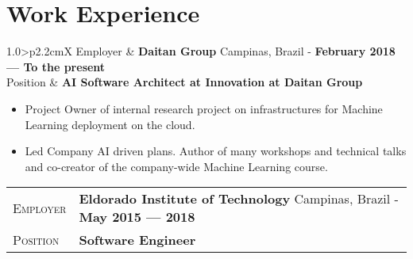 \documentclass[9pt, a4paper, oneside, final]{scrartcl} %
\newcommand{\gray}{\rowcolor[gray]{.90}} %
\begin{document}


\section{Work Experience}

\begin{center}
\begin{tabularx}{1.0\linewidth}{>{\raggedleft\scshape}p{2.2cm}X}
\gray Employer & \textbf{Daitan Group} \hfill Campinas, Brazil - \textbf{February 2018 --- To the present}\\
\gray Position & \textbf{AI Software Architect at Innovation at Daitan Group}\\
\end{tabularx}
\end{center}

\begin{itemize}\itemsep1.0pt \parskip1.5pt 
\item Project Owner of internal research project on infrastructures for Machine Learning deployment on the cloud.
\item Led Company AI driven plans. Author of many workshops and technical talks and co-creator of the company-wide Machine Learning course.  
\end{itemize}

\begin{center}
\begin{tabularx}{1.0\linewidth}{>{\raggedleft\scshape}p{2.2cm}X}
\gray Employer & \textbf{Eldorado Institute of Technology} \hfill Campinas, Brazil - \textbf{May 2015 --- 2018}\\
\gray Position & \textbf{Software Engineer}\\
\end{tabularx}
\end{center}
\end{document}
